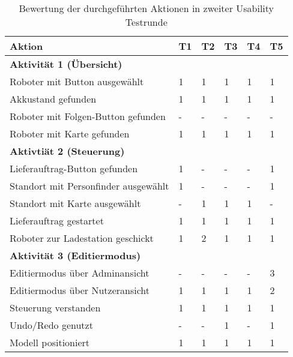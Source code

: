 \begin{table}[H]
    \caption{Bewertung der durchgeführten Aktionen in zweiter Usability Testrunde}\label{tbl:2ndUsabilityTestsActions}
    \begin{tabular}{l|lllll}
        Aktion                              & T1    & T2    & T3    & T4    & T5    \\ \hline
        \textbf{Aktivität 1 (Übersicht)}    &       &       &       &       &       \\
        Roboter mit Button ausgewählt       & 1     & 1     & 1     & 1     & 1     \\
        Akkustand gefunden                  & 1     & 1     & 1     & 1     & 1     \\
        Roboter mit Folgen-Button gefunden  & -     & -     & -     & -     & -     \\
        Roboter mit Karte gefunden          & 1     & 1     & 1     & 1     & 1     \\ \hline
        \textbf{Aktivtiät 2 (Steuerung)}    &       &       &       &       &       \\
        Lieferauftrag-Button gefunden       & 1     & -     & -     & -     & 1     \\
        Standort mit Personfinder ausgewählt& 1     & -     & -     & -     & 1     \\
        Standort mit Karte ausgewählt       & -     & 1     & 1     & 1     & -     \\
        Lieferauftrag gestartet             & 1     & 1     & 1     & 1     & 1     \\
        Roboter zur Ladestation geschickt   & 1     & 2     & 1     & 1     & 1     \\ \hline
        \textbf{Aktivität 3 (Editiermodus)} &       &       &       &       &       \\
        Editiermodus über Adminansicht       & -     & -     & -     & -     & 3     \\
        Editiermodus über Nutzeransicht      & 1     & 1     & 1     & 1     & 2     \\
        Steuerung verstanden                & 1     & 1     & 1     & 1     & 1     \\
        Undo/Redo genutzt                   & -     & -     & 1     & -     & 1     \\
        Modell positioniert                 & 1     & 1     & 1     & 1     & 1     \\
    \end{tabular}
\end{table}

